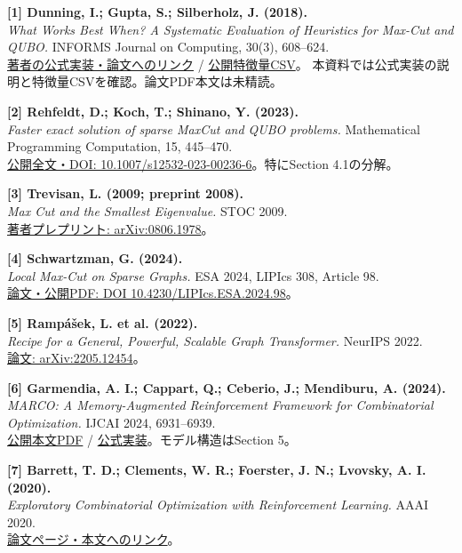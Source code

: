 \documentclass[a4paper,11pt]{ltjsarticle}
\begin{document}
{\small
\noindent\textbf{[1] Dunning, I.; Gupta, S.; Silberholz, J. (2018).}\\
\textit{What Works Best When? A Systematic Evaluation of Heuristics for Max-Cut and QUBO.} INFORMS Journal on Computing, 30(3), 608--624.\\
\href{https://github.com/MQLib/MQLib}{著者の公式実装・論文へのリンク} / \href{https://raw.githubusercontent.com/MQLib/MQLib/master/data/metrics.csv}{公開特徴量CSV}。
本資料では公式実装の説明と特徴量CSVを確認。論文PDF本文は未精読。

\noindent\textbf{[2] Rehfeldt, D.; Koch, T.; Shinano, Y. (2023).}\\
\textit{Faster exact solution of sparse MaxCut and QUBO problems.} Mathematical Programming Computation, 15, 445--470.\\
\href{https://link.springer.com/article/10.1007/s12532-023-00236-6}{公開全文・DOI: 10.1007/s12532-023-00236-6}。特にSection 4.1の分解。

\noindent\textbf{[3] Trevisan, L. (2009; preprint 2008).}\\
\textit{Max Cut and the Smallest Eigenvalue.} STOC 2009.\\
\href{https://arxiv.org/abs/0806.1978}{著者プレプリント: arXiv:0806.1978}。

\noindent\textbf{[4] Schwartzman, G. (2024).}\\
\textit{Local Max-Cut on Sparse Graphs.} ESA 2024, LIPIcs 308, Article 98.\\
\href{https://drops.dagstuhl.de/entities/document/10.4230/LIPIcs.ESA.2024.98}{論文・公開PDF: DOI 10.4230/LIPIcs.ESA.2024.98}。

\noindent\textbf{[5] Rampášek, L. et al. (2022).}\\
\textit{Recipe for a General, Powerful, Scalable Graph Transformer.} NeurIPS 2022.\\
\href{https://arxiv.org/abs/2205.12454}{論文: arXiv:2205.12454}。

\noindent\textbf{[6] Garmendia, A. I.; Cappart, Q.; Ceberio, J.; Mendiburu, A. (2024).}\\
\textit{MARCO: A Memory-Augmented Reinforcement Framework for Combinatorial Optimization.} IJCAI 2024, 6931--6939.\\
\href{https://www.ijcai.org/proceedings/2024/0766.pdf}{公開本文PDF} / \href{https://github.com/TheLeprechaun25/MARCO}{公式実装}。モデル構造はSection 5。

\noindent\textbf{[7] Barrett, T. D.; Clements, W. R.; Foerster, J. N.; Lvovsky, A. I. (2020).}\\
\textit{Exploratory Combinatorial Optimization with Reinforcement Learning.} AAAI 2020.\\
\href{https://ojs.aaai.org/index.php/AAAI/article/view/5723}{論文ページ・本文へのリンク}。
}
\end{document}
